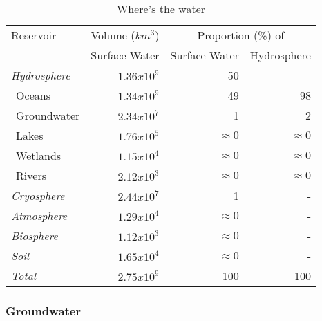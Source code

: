 \begin{table} 
\label{tab:wtw}
\centering
\caption{Where's the water}
\begin{tabular}{@{}lrrr@{}} \toprule
Reservoir						&Volume ($km^{3}$)& \multicolumn{2}{c}{Proportion (\%) of}\\ \cmidrule(r){3-4}
										&Surface Water	&Surface Water &Hydrosphere 		\\  \midrule
\emph{Hydrosphere}	&$1.36x10^{9}$	&50			&- 			\\
$\ \ $Oceans				&$1.34x10^{9}$	&49			&98 		\\
$\ \ $Groundwater		&$2.34x10^{7}$	&1			&2 			\\
$\ \ $Lakes					&$1.76x10^{5}$	&$\approx 0$	&$\approx 0$ \\
$\ \ $Wetlands			&$1.15x10^{4}$	&$\approx 0$	&$\approx 0$ \\
$\ \ $Rivers				&$2.12x10^{3}$	&$\approx 0$	&$\approx 0$ \\
\emph{Cryosphere}		&$2.44x10^{7}$	&1			&- 			\\
\emph{Atmosphere}		&$1.29x10^{4}$	&$\approx 0$	&- 			\\
\emph{Biosphere}		&$1.12x10^{3}$	&$\approx 0$	&- 			\\
\emph{Soil}					&$1.65x10^{4}$	&$\approx 0$	&- 			\\
\emph{Total}				&$2.75x10^{9}$	&100		&100 		\\  \bottomrule
\end{tabular}
\end{table}


\subsubsection{Groundwater} 
